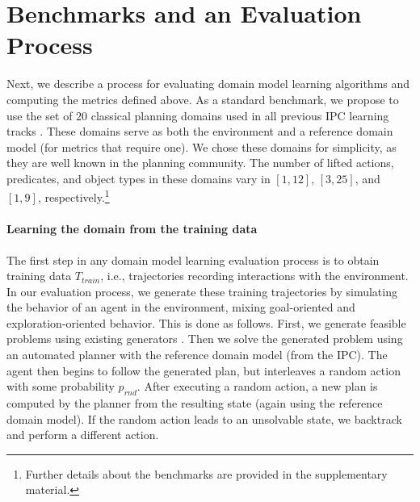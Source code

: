 \documentclass{article}
\theoremstyle{definition}
\theoremstyle{remark}
\newcommand{\T}{T}
\newcommand{\Ttrain}{\T_{train}}
\newif\ifaddcomments
\newcommand{\todo}[1]{\ifaddcomments{\textcolor{red}{[TODO: #1]}}\fi}
\newcommand{\roni}[1]{\ifaddcomments{\textcolor{red}{[Roni: #1]}}\fi}
\newcommand{\leo}[1]{\ifaddcomments{\textcolor{pink}{[Leonardo: #1]}}\fi}
\begin{document}
\section{Benchmarks and an Evaluation Process}



Next, we describe a process for evaluating domain model learning algorithms 
and computing the metrics defined above. %
%
As a standard benchmark, we propose to use the set of $20$ classical planning domains used in all previous IPC learning tracks \citep{fern2011first, vallati20152014, taitler20242023}. 
These domains serve as both the environment and a reference domain model (for metrics that require one). 
We chose these domains for simplicity, as they are well known in the planning community. 
The number of lifted actions, predicates, and object types in these domains vary in 
$[1, 12]$, $[3,25]$, and $[1, 9]$, respectively.\footnote{\label{foot:supplementary} Further details about the benchmarks are provided in the supplementary material.\roni{If space permits, let move these details back in, as the benchmark is part of our contributions}}
%
\paragraph{Learning the domain from the training data} 
The first step in any domain model learning evaluation process is to obtain training data $\Ttrain$, i.e., trajectories recording interactions with the environment. 
In our evaluation process, we generate these training trajectories by simulating the behavior of an agent in the environment, mixing goal-oriented and exploration-oriented behavior. 
This is done as follows. 
First, we generate feasible problems using existing generators \citep{seipp-et-al-zenodo2022}. 
Then we solve the generated problem using an automated planner with the reference domain model (from the IPC). 
The agent then begins to follow the generated plan, but interleaves a random action with some probability $p_{rnd}$.  
After executing a random action, a new plan is computed by the planner from the resulting state (again using the reference domain model). If the random action leads to an unsolvable state, we backtrack and perform a different action. 
\end{document}
